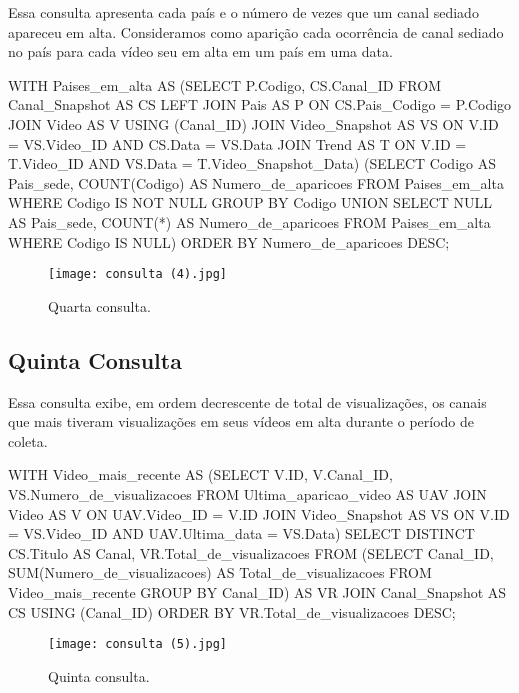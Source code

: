   Essa consulta apresenta cada país e o número de vezes que um canal sediado apareceu em alta. Consideramos como aparição cada ocorrência de canal sediado no país para cada vídeo seu em alta em um país em uma data.

\begin{code}
WITH
  Paises_em_alta AS
    (SELECT P.Codigo, CS.Canal_ID
         FROM Canal_Snapshot AS CS LEFT JOIN
        Pais AS P ON CS.Pais_Codigo = P.Codigo JOIN
          Video AS V USING (Canal_ID) JOIN
            Video_Snapshot AS VS ON V.ID = VS.Video_ID AND
                        CS.Data = VS.Data JOIN
              Trend AS T ON V.ID = T.Video_ID AND
                      VS.Data = T.Video_Snapshot_Data)
(SELECT Codigo AS Pais_sede, COUNT(Codigo) AS Numero_de_aparicoes
 FROM Paises_em_alta
 WHERE Codigo IS NOT NULL
 GROUP BY Codigo
 UNION
 SELECT NULL AS Pais_sede, COUNT(*) AS Numero_de_aparicoes
 FROM Paises_em_alta
 WHERE Codigo IS NULL)
ORDER BY Numero_de_aparicoes DESC;
\end{code}

\begin{figure}[H]
  \centering
  \texttt{[image: consulta (4).jpg]}
  \caption{Quarta consulta.}
\end{figure}

\subsection{Quinta Consulta}

  Essa consulta exibe, em ordem decrescente de total de visualizações, os canais que mais tiveram visualizações em seus vídeos em alta durante o período de coleta.

\begin{code}
WITH
  Video_mais_recente AS
    (SELECT V.ID, V.Canal_ID, VS.Numero_de_visualizacoes
         FROM Ultima_aparicao_video AS UAV JOIN
          Video AS V ON UAV.Video_ID = V.ID JOIN
            Video_Snapshot AS VS ON V.ID = VS.Video_ID AND
                        UAV.Ultima_data = VS.Data)
SELECT DISTINCT CS.Titulo AS Canal, VR.Total_de_visualizacoes
FROM (SELECT Canal_ID, SUM(Numero_de_visualizacoes) AS Total_de_visualizacoes
    FROM Video_mais_recente
      GROUP BY Canal_ID) AS VR JOIN
    Canal_Snapshot AS CS USING (Canal_ID)
ORDER BY VR.Total_de_visualizacoes DESC;
\end{code}

\begin{figure}[H]
  \centering
  \texttt{[image: consulta (5).jpg]}
  \caption{Quinta consulta.}
\end{figure}


